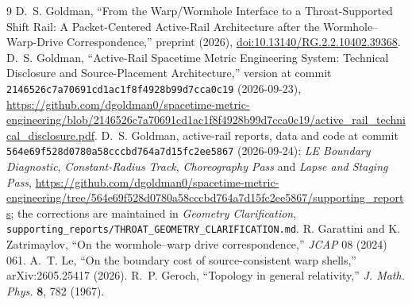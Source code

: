 \documentclass[10pt]{article}
\begin{document}
\begingroup
\small
\raggedright
\renewcommand{\section}[2]{\vspace{4pt}\textbf{References}\par}
\begin{thebibliography}{9}
\setlength{\itemsep}{1pt}
 D.~S. Goldman, ``From the Warp/Wormhole Interface to a Throat-Supported Shift Rail: A Packet-Centered
Active-Rail Architecture after the Wormhole--Warp-Drive Correspondence,'' preprint (2026),
\href{https://doi.org/10.13140/RG.2.2.10402.39368}{doi:10.13140/RG.2.2.10402.39368}.
 D.~S. Goldman, ``Active-Rail Spacetime Metric Engineering System: Technical Disclosure and
Source-Placement Architecture,'' version at commit \texttt{2146526c7a70691cd1ac1f8f4928b99d7cca0c19} (2026-09-23),
\url{https://github.com/dgoldman0/spacetime-metric-engineering/blob/2146526c7a70691cd1ac1f8f4928b99d7cca0c19/active_rail_technical_disclosure.pdf}.
 D.~S. Goldman, active-rail reports, data and code at commit
\texttt{564e69f528d0780a58cccbd764a7d15fc2ee5867} (2026-09-24): \emph{LE Boundary Diagnostic}, \emph{Constant-Radius
Track}, \emph{Choreography Pass} and \emph{Lapse and Staging Pass},
\url{https://github.com/dgoldman0/spacetime-metric-engineering/tree/564e69f528d0780a58cccbd764a7d15fc2ee5867/supporting_reports};
the corrections are maintained in \emph{Geometry Clarification}, \texttt{supporting\_reports/THROAT\_GEOMETRY\_CLARIFICATION.md}.
 R. Garattini and K. Zatrimaylov, ``On the wormhole--warp drive correspondence,'' \emph{JCAP} 08 (2024) 061.
 A.~T. Le, ``On the boundary cost of source-consistent warp shells,'' arXiv:2605.25417 (2026).
 R.~P. Geroch, ``Topology in general relativity,'' \emph{J. Math. Phys.} \textbf{8}, 782 (1967).
\end{thebibliography}
\endgroup
\end{document}
